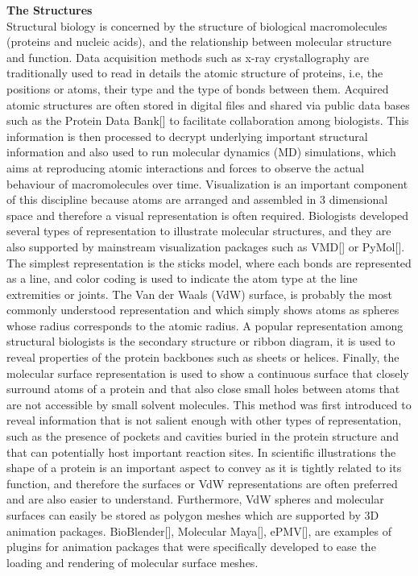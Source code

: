 \textbf{The Structures}\\
Structural biology is concerned by the structure of biological macromolecules (proteins and nucleic acids), and the relationship between molecular structure and function.
Data acquisition methods such as x-ray crystallography are traditionally used to read in details the atomic structure of proteins, i.e, the positions or atoms, their type and the type of bonds between them.
Acquired atomic structures are often stored in digital files and shared via public data bases such as the Protein Data Bank[] to facilitate collaboration among biologists.
This information is then processed to decrypt underlying important structural information and also used to run molecular dynamics (MD) simulations, which aims at reproducing atomic interactions and forces to observe the actual behaviour of macromolecules over time.
Visualization is an important component of this discipline because atoms are arranged and assembled in 3 dimensional space and therefore a visual representation is often required.
Biologists developed several types of representation to illustrate molecular structures, and they are also supported by mainstream visualization packages such as VMD[] or PyMol[].
The simplest representation is the sticks model, where each bonds are represented as a line, and color coding is used to indicate the atom type at the line extremities or joints.
The Van der Waals (VdW) surface, is probably the most commonly understood representation and which simply shows atoms as spheres whose radius corresponds to the atomic radius.
A popular representation among structural biologists is the secondary structure or ribbon diagram, it is used to reveal properties of the protein backbones such as sheets or helices.
Finally, the molecular surface representation is used to show a continuous surface that closely surround atoms of a protein and that also close small holes between atoms that are not accessible by small solvent molecules.
This method was first introduced to reveal information that is not salient enough with other types of representation, such as the presence of pockets and cavities buried in the protein structure and that can potentially host important reaction sites.
In scientific illustrations the shape of a protein is an important aspect to convey as it is tightly related to its function, and therefore the surfaces or VdW representations are often preferred and are also easier to understand.
Furthermore, VdW spheres and molecular surfaces can easily be stored as polygon meshes which are supported by 3D animation packages.
BioBlender[], Molecular Maya[], ePMV[], are examples of plugins for animation packages that were specifically developed to ease the loading and rendering of molecular surface meshes.

